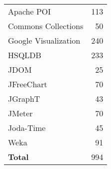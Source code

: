 
   {

\centering

      \begin{tabular}{l@{\quad\quad}
         r
      }

                  Apache POI & 113 \\
         Commons Collections & 50 \\
         Google Visualization & 240 \\
         HSQLDB & 233 \\[0.5em]
         JDOM & 25 \\
         JFreeChart & 70 \\
         JGraphT & 43 \\
         JMeter & 70 \\[0.5em]
         Joda-Time & 45 \\
         Weka & 91 \\[0.7em]
         {\bf Total} & 994 \\
         
      \end{tabular}

   }
